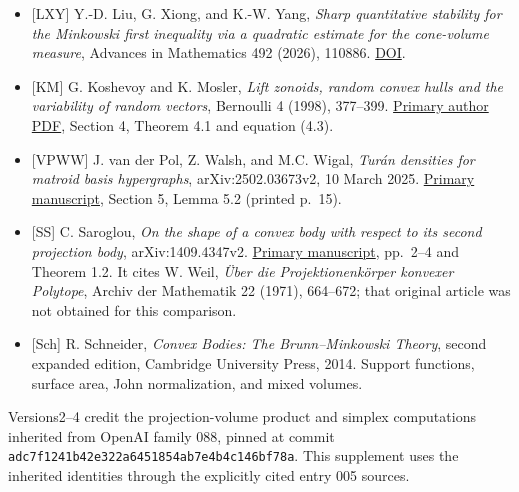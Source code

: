 \documentclass[
  11pt,
]{article}
\begin{document}
\begin{itemize}
{  classes of convex bodies}, Mathematika 57 (2011), 329--353.
  \href{https://doi.org/10.1112/S0025579311001860}{DOI}.
\item
  {[}LXY{]} Y.-D. Liu, G. Xiong, and K.-W. Yang, \emph{Sharp
  quantitative stability for the Minkowski first inequality via a
  quadratic estimate for the cone-volume measure}, Advances in
  Mathematics 492 (2026), 110886.
  \href{https://doi.org/10.1016/j.aim.2026.110886}{DOI}.
\item
  {[}KM{]} G. Koshevoy and K. Mosler, \emph{Lift zonoids, random convex
  hulls and the variability of random vectors}, Bernoulli 4 (1998),
  377--399.
  \href{https://wisostat.uni-koeln.de/sites/dep_econometrics/pdf_publikationen/1998_KoshevoyM98.pdf}{Primary
  author PDF}, Section 4, Theorem 4.1 and equation (4.3).
\item
  {[}VPWW{]} J. van der Pol, Z. Walsh, and M.C. Wigal, \emph{Turán
  densities for matroid basis hypergraphs}, arXiv:2502.03673v2, 10 March
  2025. \href{https://arxiv.org/html/2502.03673v2\#S5}{Primary
  manuscript}, Section 5, Lemma 5.2 (printed p.~15).
\item
  {[}SS{]} C. Saroglou, \emph{On the shape of a convex body with respect
  to its second projection body}, arXiv:1409.4347v2.
  \href{https://arxiv.org/pdf/1409.4347v2}{Primary manuscript}, pp.~2--4
  and Theorem 1.2. It cites W. Weil, \emph{Über die Projektionenkörper
  konvexer Polytope}, Archiv der Mathematik 22 (1971), 664--672; that
  original article was not obtained for this comparison.
\item
  {[}Sch{]} R. Schneider, \emph{Convex Bodies: The Brunn--Minkowski
  Theory}, second expanded edition, Cambridge University Press, 2014.
  Support functions, surface area, John normalization, and mixed
  volumes.
\end{itemize}

Versions2--4 credit the projection-volume product and simplex
computations inherited from OpenAI family 088, pinned at commit
\texttt{adc7f1241b42e322a6451854ab7e4b4c146bf78a}. This supplement uses
the inherited identities through the explicitly cited entry 005 sources.
\end{document}
